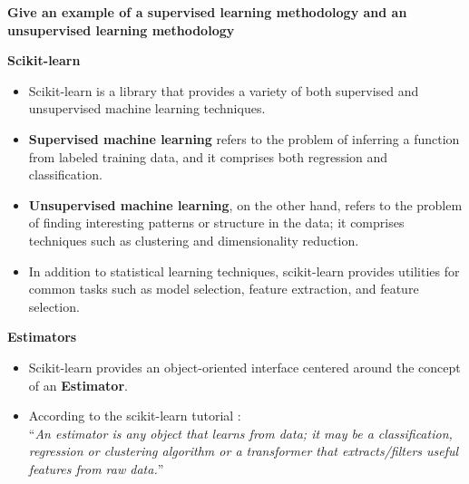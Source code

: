 \documentclass[SKL-MASTER.tex]{subfiles}
\begin{document}
\textbf{Give an example of a supervised learning methodology and an unsupervised learning methodology}




\newpage
	\LARGE
	\textbf{Scikit-learn}\\
	\begin{itemize}
	\item Scikit-learn is a library that provides a variety of both supervised and unsupervised machine learning techniques. 
	\item \textbf{Supervised machine learning} refers to the problem of inferring a function from labeled training data, and it comprises both regression and classification. 
	\end{itemize}


\LARGE
	
	\begin{itemize}
		\item	
	\textbf{Unsupervised machine learning}, on the other hand, refers to the problem of finding interesting patterns or structure in the data; it comprises techniques such as clustering and dimensionality reduction.
	\item  In addition to statistical learning techniques, scikit-learn provides utilities for common tasks such as model selection, feature extraction, and feature selection.
\end{itemize}
\newpage
	\LARGE
	\textbf{Estimators}
\begin{itemize}
\item Scikit-learn provides an object-oriented interface centered around the concept of an \textbf{Estimator}. \item According to the scikit-learn tutorial : \\ “\textit{An estimator is any object that learns from data; it may be a classification, regression or clustering algorithm or a transformer that extracts/filters useful features from raw data.}” 	
\end{itemize}
\end{document}
